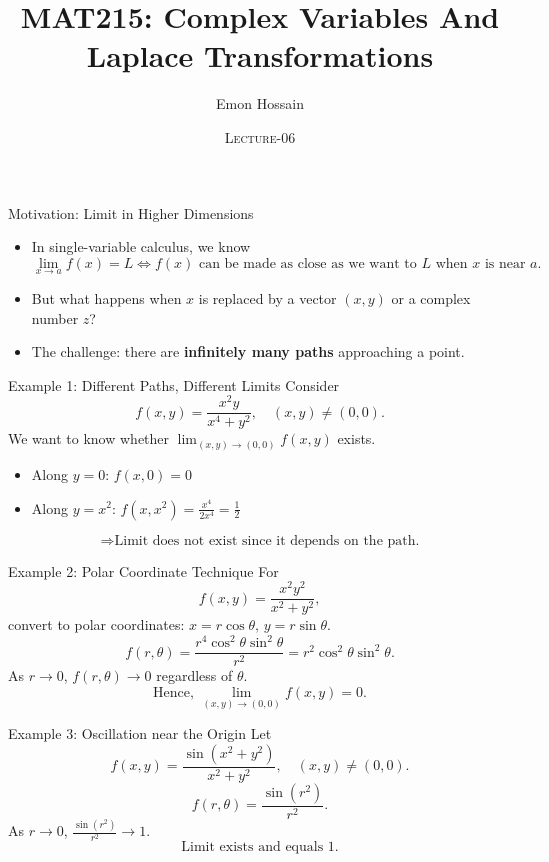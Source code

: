 \documentclass[11pt]{beamer}
\author[] %
{Emon Hossain\inst{1}}
\institute[University of Dhaka] %
{
  \inst{1}%
  Lecturer\\MNS department\\Brac University
}
\date[] %
{\textsc{Lecture-06}}
\title[]{MAT215: Complex Variables And Laplace Transformations}
\theoremstyle{plain}
\begin{document}
\begin{frame}
\titlepage
\end{frame}


\begin{frame}{Motivation: Limit in Higher Dimensions}
\begin{itemize}
    \item In single-variable calculus, we know
    \[
        \lim_{x \to a} f(x) = L
        \iff f(x) \text{ can be made as close as we want to } L \text{ when } x \text{ is near } a.
    \]
    \item But what happens when \(x\) is replaced by a vector \((x,y)\) or a complex number \(z\)?
    \item The challenge: there are \textbf{infinitely many paths} approaching a point.
\end{itemize}
\end{frame}

\begin{frame}{Example 1: Different Paths, Different Limits}
Consider
\[
    f(x,y) = \frac{x^2y}{x^4 + y^2}, \quad (x,y) \neq (0,0).
\]
We want to know whether \(\displaystyle \lim_{(x,y)\to(0,0)} f(x,y)\) exists.
\pause
\begin{itemize}
    \item Along \(y = 0\): \(f(x,0)=0\)
    \item Along \(y = x^2\): \(f(x,x^2)=\frac{x^4}{2x^4}=\frac{1}{2}\)
\end{itemize}
\pause
\[
\Rightarrow \text{Limit does not exist since it depends on the path.}
\]
\end{frame}

\begin{frame}{Example 2: Polar Coordinate Technique}
For
\[
    f(x,y) = \frac{x^2y^2}{x^2+y^2},
\]
convert to polar coordinates: \(x=r\cos\theta, \, y=r\sin\theta\).
\pause
\[
    f(r,\theta) = \frac{r^4\cos^2\theta \sin^2\theta}{r^2} = r^2 \cos^2\theta \sin^2\theta.
\]
\pause
As \(r \to 0\), \(f(r,\theta) \to 0\) regardless of \(\theta\).
\[
\boxed{\text{Hence, } \lim_{(x,y)\to(0,0)} f(x,y)=0.}
\]
\end{frame}

\begin{frame}{Example 3: Oscillation near the Origin}
Let
\[
    f(x,y) = \frac{\sin(x^2 + y^2)}{x^2 + y^2}, \quad (x,y)\neq(0,0).
\]
\pause
\[
    f(r,\theta) = \frac{\sin(r^2)}{r^2}.
\]
\pause
As \(r\to 0\), \(\frac{\sin(r^2)}{r^2}\to 1\).
\[
\boxed{\text{Limit exists and equals } 1.}
\]
\end{frame}
\end{document}
